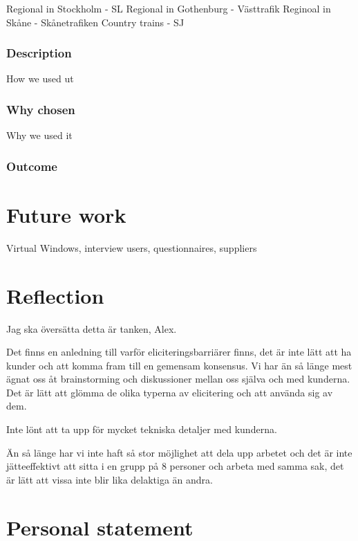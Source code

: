 \documentclass[a4paper]{article}
\begin{document}
    Regional in Stockholm - SL
    Regional in Gothenburg - Västtrafik
    Reginoal in Skåne - Skånetrafiken
    Country trains - SJ
    
    \subsubsection{Description}
    How we used ut
    \subsubsection{Why chosen}
    Why we used it
    \subsubsection{Outcome}
    
  \section{Future work}
  Virtual Windows, interview users, questionnaires, suppliers
  
  \section{Reflection}

  Jag ska översätta detta är tanken, Alex.

  Det finns en anledning till varför eliciteringsbarriärer finns, det är inte lätt att ha kunder och att komma fram till en gemensam konsensus.
  Vi har än så länge mest ägnat oss åt brainstorming och diskussioner mellan oss själva och med kunderna. Det är lätt att glömma de olika typerna av elicitering och att använda sig av dem. 
  
  Inte lönt att ta upp för mycket tekniska detaljer med kunderna.

	Än så länge har vi inte haft så stor möjlighet att dela upp arbetet och det är inte jätteeffektivt att sitta i en grupp på 8 personer och arbeta med samma sak, det är lätt att vissa inte blir lika delaktiga än andra. 


  \section{Personal statement}
  
\end{document}
